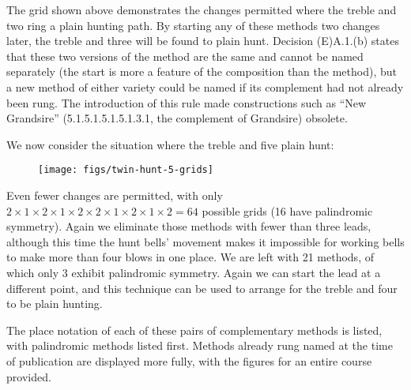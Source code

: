 The grid shown above demonstrates the changes permitted where the treble and two
ring a plain hunting path.
By starting any of these methods two changes later,
the treble and three will be found to plain hunt.
Decision (E)A.1.(b) states that these two versions of the method are the same
and cannot be named separately
(the start is more a feature of the composition than the method),
but a new method of either variety could be named if its complement had not
already been rung.
The introduction of this rule made constructions such as ``New Grandsire''
(5.1.5.1.5.1.5.1.3.1, the complement of Grandsire) obsolete.

We now consider the situation where the treble and five plain hunt:

\begin{figure}[h]
  \centering
  \texttt{[image: figs/twin-hunt-5-grids]}
\end{figure}

Even fewer changes are permitted, with only
\(2\times1\times2\times1\times2\times2\times1\times2\times1\times2 = 64\)
possible grids (16 have palindromic symmetry).
Again we eliminate those methods with fewer than three leads,
although this time the hunt bells’ movement makes it impossible for working
bells to make more than four blows in one place.
We are left with 21 methods, of which only 3 exhibit palindromic symmetry.
Again we can start the lead at a different point, and this technique can be used
to arrange for the treble and four to be plain hunting.

The place notation of each of these pairs of complementary methods is listed,
with palindromic methods listed first.
Methods already rung named at the time of publication are displayed more fully,
with the figures for an entire course provided.
